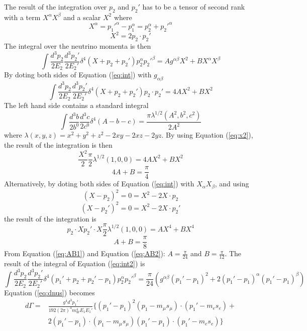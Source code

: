 \documentclass{outhesis}
\begin{document}
The result of the integration over $p_2$ and $p_2'$ has to be a tensor of second rank with a term $X^\alpha X^\beta$ and a scalar $X^2$ where 
\[X^\alpha = p_1'^\alpha-p_1^\alpha = p_2^\alpha + p_2'^\alpha\]
 \begin{equation}
\label{eq:x2}
X^2 = 2p_2\cdot p_2'
 \end{equation}
 The integral over the neutrino momenta is then 
 \begin{equation}
 \label{eq:int}
 \int\frac{d^3p_2}{ 2E_2}\frac{d^3p_2'}{ 2E_2'}\delta^4\left(X+p_2+p_2' \right)p_2^\alpha p_2'^\beta = Ag^{\alpha\beta}X^2 + B X^\alpha X^\beta
\end{equation}
By doting both sides of Equation (\ref{eq:int}) with $g_{\alpha\beta}$
 \begin{equation}
 \label{eq:int2}
 \int\frac{d^3p_2}{ 2E_2}\frac{d^3p_2'}{ 2E_2'}\delta^4\left(X+p_2+p_2' \right)p_2\cdot p_2' = 4AX^2 + B X^2
\end{equation}
The left hand side contains a standard integral
\[
 \int\frac{d^3b}{ 2b^0}\frac{d^3c}{ 2c^0}\delta^4\left(A-b-c \right) = \frac{\pi \lambda^{1/2}\left(A^2,b^2,c^2 \right)}{2A^2}
\]
where $ \lambda(x,y,z) = x^2+y^2+z^2-2xy-2xz-2yz$. By using Equation (\ref{eq:x2}), the result of the integration is then
\[
\frac{X^2}{2} \frac{\pi}{2} \lambda^{1/2}\left(1,0,0  \right) = 4AX^2 + BX^2
\]
 \begin{equation}
  \label{eq:AB1}
 4A+B = \frac{\pi}{4}
  \end{equation}
 Alternatively, by doting both sides of Equation (\ref{eq:int}) with $X_\alpha X_\beta$, and using
\[
 \left(X-p_2  \right)^2 = 0 = X^2-2X\cdot p_2
 \]
 \[
 \left(X-p_2'  \right)^2 = 0 = X^2-2X\cdot p_2'
 \]
 the result of the integration is
 \[
p_2\cdot X p_2' \cdot X \frac{\pi}{2} \lambda^{1/2}\left(1,0,0  \right) = AX^4 + BX^4
\]
 \begin{equation}
 \label{eq:AB2}
 A+B = \frac{\pi}{8}
  \end{equation}
 From Equation (\ref{eq:AB1}) and Equation (\ref{eq:AB2}): $A = \frac{\pi}{24}$ and $B = \frac{\pi}{12}$. The result of the integral of Equation (\ref{eq:int2}) is 
\begin{equation}
 \int\frac{d^3p_2}{ 2E_2}\frac{d^3p_2'}{ 2E_2'}\delta^4\left(p_1'+p_2+p_2'-p_1 \right)p_2^\alpha p_2'^\beta = \frac{\pi}{24}\left( 
 g^{\alpha\beta}\left(p_1'-p_1\right)^2 + 2 \left(p_1'-p_1\right)^\alpha \left(p_1'-p_1\right)^\beta \right)
 \end{equation}
 Equation (\ref{eq:dnus}) becomes
 \begin{equation}
\label{eq:dnus2}
\begin{split}
d\Gamma= &\frac{g^4d^3p_1'}{192\left(2\pi\right)^4 m_W^4E_1E_1'}
\{\left(p_1'-p_1 \right)^2\left(p_1-m_{\mu} s_{\mu} \right)\cdot\left(p_1'-m_e s_e \right) +\\
& 2\left(p_1'-p_1 \right)\cdot \left(p_1-m_{\mu} s_{\mu} \right)\left(p_1'-p_1 \right)\cdot \left(p_1' - m_e s_e\right)\}
\end{split}
\end{equation}
\end{document}
